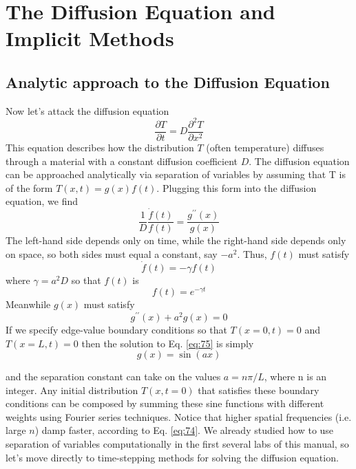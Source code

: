 
\chapter*{The Diffusion Equation and Implicit Methods}
\section*{Analytic approach to the Diffusion Equation}

Now let\rq s attack the diffusion equation
\begin{equation}\label{eq:71}
\frac{\partial T}{\partial t}=D \frac{\partial^{2} T}{\partial x^{2}}
\end{equation}
This equation describes how the distribution $T$ (often temperature) diffuses
through a material with a constant diffusion coefficient $D$. The diffusion equation
can be approached analytically via separation of variables by assuming that T is
of the form $T(x,t) = g(x)f(t)$. Plugging this form into the diffusion equation, we
find
\begin{equation}\label{eq:72}
\frac{1}{D} \frac{\dot{f}(t)}{f(t)}=\frac{g^{\prime \prime}(x)}{g(x)}
\end{equation}
The left-hand side depends only on time, while the right-hand side depends only
on space, so both sides must equal a constant, say $-a^2$. Thus, $f (t)$ must satisfy
\begin{equation}\label{eq:73}
\dot{f}(t)=-\gamma f(t)
\end{equation}
where $ \gamma = a^2 D$ so that $f(t)$ is
\begin{equation}\label{eq:74}
f(t)=e^{-\gamma t}
\end{equation}
Meanwhile $g(x)$ must satisfy
\begin{equation}\label{eq:75}
g^{\prime \prime}(x)+a^{2} g(x)=0
\end{equation}
If we specify edge-value boundary conditions so that $T(x = 0,t) = 0$ and $T(x =
L,t) = 0$ then the solution to Eq. \eqref{eq:75} is simply
\begin{equation}\label{eq:76}
g(x) = \sin(ax)
\end{equation}

and the separation constant can take on the values $a = n \pi /L$, where n is an integer.
Any initial distribution $T(x,t = 0)$ that satisfies these boundary conditions can be
composed by summing these sine functions with different weights using Fourier
series techniques. Notice that higher spatial frequencies (i.e. large $n$) damp faster,
according to Eq. \eqref{eq:74}. We already studied how to use separation of variables
computationally in the first several labs of this manual, so let\rq s move directly to
time-stepping methods for solving the diffusion equation.

